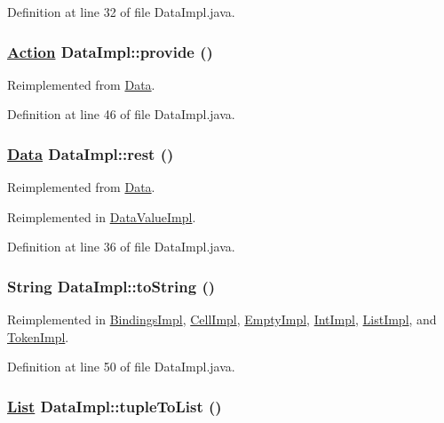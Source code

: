 Definition at line 32 of file Data\-Impl.java.\hypertarget{classDataImpl_a5}{
\subsubsection[provide]{\setlength{\rightskip}{0pt plus 5cm}\hyperlink{interfaceAction}{Action} Data\-Impl::provide ()}}
\label{classDataImpl_a5}




Reimplemented from \hyperlink{interfaceData_a5}{Data}.

Definition at line 46 of file Data\-Impl.java.\hypertarget{classDataImpl_a3}{
\subsubsection[rest]{\setlength{\rightskip}{0pt plus 5cm}\hyperlink{interfaceData}{Data} Data\-Impl::rest ()}}
\label{classDataImpl_a3}




Reimplemented from \hyperlink{interfaceData_a3}{Data}.

Reimplemented in \hyperlink{classDataValueImpl_a1}{Data\-Value\-Impl}.

Definition at line 36 of file Data\-Impl.java.\hypertarget{classDataImpl_a6}{
\subsubsection[toString]{\setlength{\rightskip}{0pt plus 5cm}String Data\-Impl::to\-String ()}}
\label{classDataImpl_a6}




Reimplemented in \hyperlink{classBindingsImpl_a4}{Bindings\-Impl}, \hyperlink{classCellImpl_a0}{Cell\-Impl}, \hyperlink{classEmptyImpl_a4}{Empty\-Impl}, \hyperlink{classIntImpl_a10}{Int\-Impl}, \hyperlink{classListImpl_a6}{List\-Impl}, and \hyperlink{classTokenImpl_a1}{Token\-Impl}.

Definition at line 50 of file Data\-Impl.java.\hypertarget{classDataImpl_a1}{
\subsubsection[tupleToList]{\setlength{\rightskip}{0pt plus 5cm}\hyperlink{interfaceList}{List} Data\-Impl::tuple\-To\-List ()}}
\label{classDataImpl_a1}




